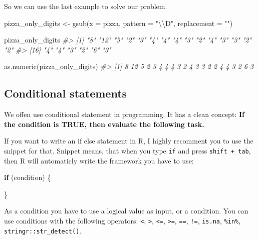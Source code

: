 \documentclass[
]{article}
\newenvironment{Shaded}{\begin{snugshade}}{\end{snugshade}}
\newcommand{\AttributeTok}[1]{\textcolor[rgb]{0.77,0.63,0.00}{#1}}
\newcommand{\CommentTok}[1]{\textcolor[rgb]{0.56,0.35,0.01}{\textit{#1}}}
\newcommand{\ControlFlowTok}[1]{\textcolor[rgb]{0.13,0.29,0.53}{\textbf{#1}}}
\newcommand{\FunctionTok}[1]{\textcolor[rgb]{0.00,0.00,0.00}{#1}}
\newcommand{\NormalTok}[1]{#1}
\newcommand{\OtherTok}[1]{\textcolor[rgb]{0.56,0.35,0.01}{#1}}
\newcommand{\SpecialCharTok}[1]{\textcolor[rgb]{0.00,0.00,0.00}{#1}}
\newcommand{\StringTok}[1]{\textcolor[rgb]{0.31,0.60,0.02}{#1}}
\begin{document}
So we can use the last example to solve our problem.

\begin{Shaded}
\begin{Highlighting}[]
\NormalTok{pizza\_only\_digits }\OtherTok{\textless{}{-}} \FunctionTok{gsub}\NormalTok{(}\AttributeTok{x =}\NormalTok{ pizza, }\AttributeTok{pattern =} \StringTok{"}\SpecialCharTok{\textbackslash{}\textbackslash{}}\StringTok{D"}\NormalTok{, }\AttributeTok{replacement =} \StringTok{""}\NormalTok{) }

\NormalTok{pizza\_only\_digits}
\CommentTok{\#\textgreater{}  [1] "8"  "12" "5"  "2"  "3"  "4"  "4"  "4"  "3"  "2"  "4"  "3"  "3"  "2"  "2" }
\CommentTok{\#\textgreater{} [16] "4"  "4"  "3"  "2"  "6"  "3"}

\FunctionTok{as.numeric}\NormalTok{(pizza\_only\_digits)}
\CommentTok{\#\textgreater{}  [1]  8 12  5  2  3  4  4  4  3  2  4  3  3  2  2  4  4  3  2  6  3}
\end{Highlighting}
\end{Shaded}

\hypertarget{conditional-statements}{%
\subsection{Conditional statements}\label{conditional-statements}}

We offen use conditional statement in programming. It has a clean concept: \textbf{If the condition is TRUE, then evaluate the following task.}

If you want to write an if else statement in R, I highly recomment you to use the snippet for that. Snippet means, that when you type \texttt{if} and press \texttt{shift\ +\ tab}, then R will automaticly write the framework you have to use:

\begin{Shaded}
\begin{Highlighting}[]
\ControlFlowTok{if}\NormalTok{ (condition) \{}
  
\NormalTok{\}}
\end{Highlighting}
\end{Shaded}

As a condition you have to use a logical value as input, or a condition. You can use conditions with the following operators: \texttt{\textless{}}, \texttt{\textgreater{}}, \texttt{\textless{}=}, \texttt{\textgreater{}=}, \texttt{==}, \texttt{!=}, \texttt{is.na}, \texttt{\%in\%}, \texttt{stringr::str\_detect()}.
\end{document}

